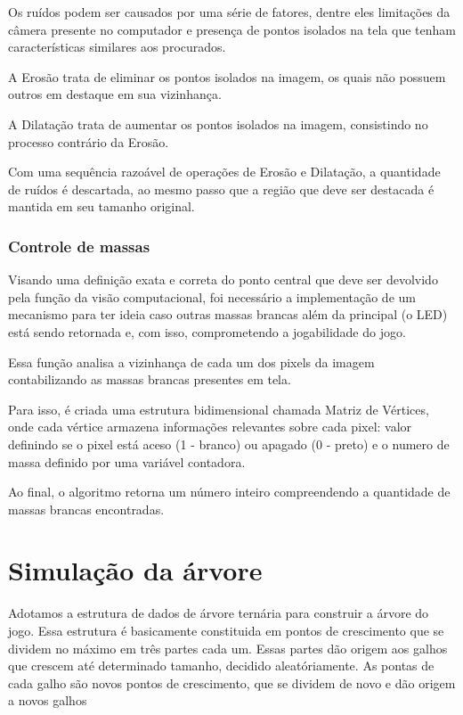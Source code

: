 \documentclass[12pt]{article}
\begin{document}
Os ru\'idos podem ser causados por uma s\'erie de fatores, dentre eles limita\c c\~oes da c\^amera presente no computador
e presen\c ca de pontos isolados na tela que tenham caracter\'isticas similares aos procurados.

A Eros\~ao trata de eliminar os pontos isolados na imagem, os quais n\~ao possuem outros em destaque em sua vizinhan\c ca.

A Dilata\c c\~ao trata de aumentar os pontos isolados na imagem, consistindo no processo contr\'ario da Eros\~ao.

Com uma sequ\^encia razo\'avel de opera\c c\~oes de Eros\~ao e Dilata\c c\~ao, a quantidade de ru\'idos \'e descartada,
ao mesmo passo que a regi\~ao que deve ser destacada \'e mantida em seu tamanho original.

\subsubsection{Controle de massas}
Visando uma defini\c c\~ao exata e correta do ponto central que deve ser devolvido pela fun\c c\~ao da vis\~ao computacional,
foi necess\'ario a implementa\c c\~ao de um mecanismo para ter ideia caso outras massas brancas al\'em da principal (o LED)
est\'a sendo retornada e, com isso, comprometendo a jogabilidade do jogo.

Essa fun\c c\~ao analisa a vizinhan\c ca de cada um dos pixels da imagem contabilizando as massas brancas presentes em tela.

Para isso, \'e criada uma estrutura bidimensional chamada Matriz de V\'ertices, onde cada v\'ertice armazena informa\c c\~oes
relevantes sobre cada pixel: valor definindo se o pixel está aceso (1 - branco) ou apagado (0 - preto) e o numero de massa
definido por uma vari\'avel contadora.

Ao final, o algoritmo retorna um n\'umero inteiro compreendendo a quantidade de massas brancas encontradas.

\section{Simula\c c\~ao da \'arvore}

Adotamos a estrutura de dados de \'arvore tern\'aria para construir a \'arvore do jogo. Essa estrutura \'e basicamente constituida
em pontos de crescimento que se dividem no m\'aximo em tr\^es partes cada um. Essas partes d\~ao origem aos galhos que crescem at\'e
determinado tamanho, decidido aleat\'oriamente. As pontas de cada galho s\~ao novos pontos de crescimento,
que se dividem de novo e d\~ao origem a novos galhos
\end{document}
